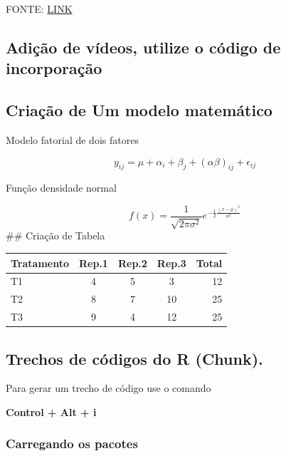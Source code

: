 \documentclass[
]{article}
\begin{document}
FONTE:
\href{https://www.telegram.com/story/opinion/2021/04/23/peanuts-snoopy-cartoon-don-landgren/7332261002/}{LINK}

\hypertarget{adiuxe7uxe3o-de-vuxeddeos-utilize-o-cuxf3digo-de-incorporauxe7uxe3o}{%
\subsection{Adição de vídeos, utilize o código de
incorporação}\label{adiuxe7uxe3o-de-vuxeddeos-utilize-o-cuxf3digo-de-incorporauxe7uxe3o}}

\hypertarget{criauxe7uxe3o-de-um-modelo-matemuxe1tico}{%
\subsection{Criação de Um modelo
matemático}\label{criauxe7uxe3o-de-um-modelo-matemuxe1tico}}

Modelo fatorial de dois fatores

\[
y_{ij} = \mu+\alpha_i+\beta_j+(\alpha \beta)_{ij} + \epsilon_{ij}
\]

Função densidade normal

\[
f(x)=\frac{1}{\sqrt{2\pi\sigma^2}} e^{-\frac{1}{2}\frac{(x-\mu)^2}{\sigma^2} }
\] \#\# Criação de Tabela

\begin{longtable}[]{@{}lcccr@{}}
\toprule\noalign{}
Tratamento & Rep.1 & Rep.2 & Rep.3 & Total \\
\midrule\noalign{}
\endhead
\bottomrule\noalign{}
\endlastfoot
T1 & 4 & 5 & 3 & 12 \\
T2 & 8 & 7 & 10 & 25 \\
T3 & 9 & 4 & 12 & 25 \\
\end{longtable}

\hypertarget{trechos-de-cuxf3digos-do-r-chunk.}{%
\subsection{Trechos de códigos do R
(Chunk).}\label{trechos-de-cuxf3digos-do-r-chunk.}}

Para gerar um trecho de código use o comando

\textbf{Control + Alt + i}

\hypertarget{carregando-os-pacotes}{%
\subsubsection{Carregando os pacotes}\label{carregando-os-pacotes}}
\end{document}
